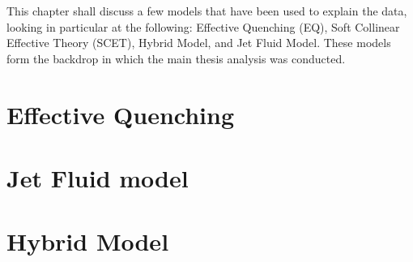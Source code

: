 
This chapter shall discuss a few models that have been used to explain the data, looking in particular at the following: Effective Quenching (EQ), Soft Collinear Effective Theory (SCET), Hybrid Model, and Jet Fluid Model. These models form the backdrop in which the main thesis analysis was conducted.

\section{Effective Quenching}

\label{sec:eff_quench}

\section{Jet Fluid model}

\label{sec:jet_fluid}

\section{Hybrid Model}

\label{sec:hybrid_model}




